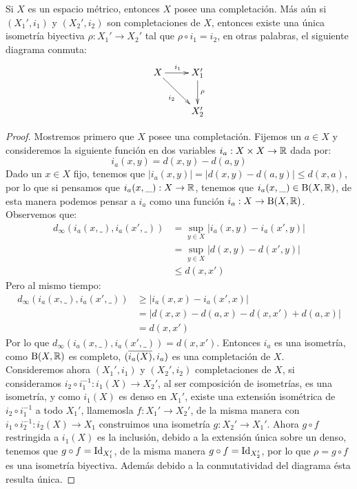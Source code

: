 \documentclass[12pt,a4paper]{book}
\begin{document}
\begin{teo}
Si $X$ es un espacio métrico, entonces $X$ posee una completación. Más aún si $(X_1',i_1)$ y $(X_2',i_2)$ son completaciones de $X$, entonces existe una única isometría biyectiva $\rho:X_1' \rightarrow X_2'$ tal que $\rho \circ i_1 = i_2$, en otras palabras, el siguiente diagrama conmuta:
$$
\xymatrix{
X \ar[dr]_{i_2} \ar[r]^{i_1} &X_1' \ar[d]^{\rho} \\
&X_2'
}
$$
\begin{proof} 
Mostremos primero que $X$ posee una completación. Fijemos un $a \in X$ y consideremos la siguiente función en dos variables $i_a: X \times X \rightarrow \mathbb{R}$ dada por:
$$ i_a(x,y)=d(x,y) - d(a,y)$$
Dado un $x \in X$ fijo, tenemos que $|i_a(x,y)| = | d(x,y) - d(a,y) | \leq d(x,a)$, por lo que si pensamos que $i_a(x, \_ ): X \rightarrow \mathbb{R}$, tenemos que $i_a(x, \_ ) \in \mathrm{B}(X,\mathbb{R})$, de esta manera podemos pensar a $i_a$ como una función $i_a: X \rightarrow \mathrm{B}(X,\mathbb{R})$. Observemos que:
\begin{align*}
d_{\infty}(i_a(x, \_ ), i_a(x', \_ )) &= \sup_{y \in X} {|i_a(x, y) - i_a(x',y )|} \\
 &= \sup_{y \in X} {|d(x, y) - d(x',y )|} \\
 &\leq d(x,x')
\end{align*}
Pero al mismo tiempo:
\begin{align*}
d_{\infty}(i_a(x, \_ ), i_a(x', \_ )) &\geq |i_a(x,x) - i_a(x',x)| \\
&= |d(x,x) - d(a,x) - d(x,x') + d(a,x)| \\
&= d(x,x')
\end{align*}
Por lo que $d_{\infty}(i_a(x, \_ ), i_a(x', \_ )) = d(x,x')$. Entonces $i_a$ es una isometría, como $\mathrm{B}(X,\mathbb{R})$ es completo, $(\overline{i_a(X)}, i_a)$ es una completación de $X$.\\
Consideremos ahora $(X_1',i_1)$ y $(X_2',i_2)$ completaciones de $X$, si consideramos $i_2 \circ i_1^{-1}: i_1(X) \rightarrow X_2'$, al ser composición de isometrías, es una isometría, y como $i_1(X)$ es denso en $X_1'$, existe una extensión isométrica de $i_2 \circ i_1^{-1}$ a todo $X_1'$, llamemosla $f:X_1' \rightarrow X_2'$, de la misma manera con $i_1 \circ i_2^{-1}: i_2(X) \rightarrow X_1$ construimos una isometría $g: X_2' \rightarrow X_1'$. Ahora $g \circ f$ restringida a $i_1(X)$ es la inclusión, debido a la extensión única sobre un denso, tenemos que $g \circ f = \mbox{Id}_{X_1'}$, de la misma manera $g \circ f = \mbox{Id}_{X_2'}$, por lo que $\rho = g \circ f$ es una isometría biyectiva. Además debido a la conmutatividad del diagrama ésta resulta única.
\end{proof}
\end{teo}
\end{document}
